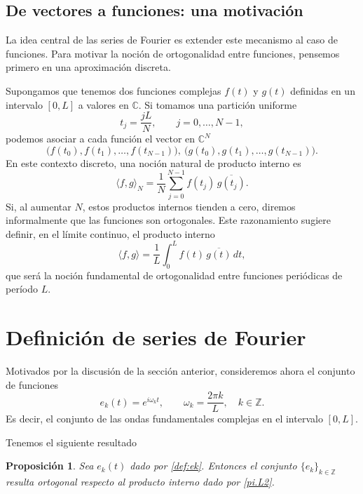\documentclass[12pt, a4paper]{amsbook}
\newcommand{\Z}{{\mathbb Z}}
\newcommand{\C}{{\mathbb C}}
\newtheorem{prop}[teo]{Proposición}
\theoremstyle{remark}
\theoremstyle{definition}
\numberwithin{section}{chapter}
\numberwithin{subsection}{section}
\numberwithin{equation}{section}
\numberwithin{figure}{chapter}
\begin{document}
\subsection{De vectores a funciones: una motivación}

La idea central de las series de Fourier es extender este mecanismo al caso de funciones. Para motivar la noción de ortogonalidad entre funciones, pensemos primero en una aproximación discreta.

Supongamos que tenemos dos funciones complejas $f(t)$ y $g(t)$ definidas en un intervalo $[0,L]$ a valores en $\C$. Si tomamos una partición uniforme
$$
t_j = \frac{jL}{N}, \qquad j=0,\dots,N-1,
$$
podemos asociar a cada función el vector en $\C^N$
$$
\bigl(f(t_0), f(t_1), \dots, f(t_{N-1})\bigr),\ \bigl(g(t_0), g(t_1), \dots, g(t_{N-1})\bigr).
$$
En este contexto discreto, una noción natural de producto interno es
$$
\langle f, g\rangle_N = \frac{1}{N}\sum_{j=0}^{N-1} f(t_j)\,\overline{g(t_j)}.
$$
Si, al aumentar $N$, estos productos internos tienden a cero, diremos informalmente que las funciones son ortogonales. Este razonamiento sugiere definir, en el límite continuo, el producto interno
\begin{equation}\label{pi.L2}
\langle f, g\rangle = \frac{1}{L}\int_0^L f(t)\,\overline{g(t)}\,dt,
\end{equation}
que será la noción fundamental de ortogonalidad entre funciones periódicas de período $L$.

\section{Definición de series de Fourier}

Motivados por la discusión de la sección anterior, consideremos ahora el conjunto de funciones
\begin{equation}\label{def:ek}
e_k(t) = e^{i\omega_k t}, \qquad  \omega_k = \frac{2\pi k}{L}, \quad k\in\Z.
\end{equation}
Es decir, el conjunto de las ondas fundamentales complejas en el intervalo $[0, L]$.

Tenemos el siguiente resultado
\begin{prop} Sea $e_k(t)$ dado por \eqref{def:ek}. Entonces el conjunto $\{e_k\}_{k\in\Z}$ resulta ortogonal respecto al producto interno dado por \eqref{pi.L2}.
\end{prop}
\end{document}
